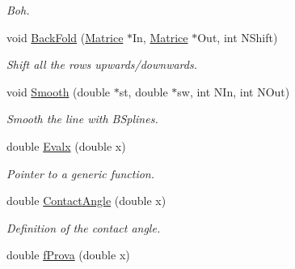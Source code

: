 \begin{DoxyCompactItemize}
\begin{DoxyCompactList}\small\item\em Boh. \end{DoxyCompactList}\item 
void \hyperlink{classMatematica_abfaf13060e1740268d65e5a38a410cd6}{Back\+Fold} (\hyperlink{classMatrice}{Matrice} $\ast$In, \hyperlink{classMatrice}{Matrice} $\ast$Out, int N\+Shift)\hypertarget{classMatematica_abfaf13060e1740268d65e5a38a410cd6}{}\label{classMatematica_abfaf13060e1740268d65e5a38a410cd6}

\begin{DoxyCompactList}\small\item\em Shift all the rows upwards/downwards. \end{DoxyCompactList}\item 
void \hyperlink{classMatematica_a2cd25ce574ac8496d0228106f1acb7e6}{Smooth} (double $\ast$st, double $\ast$sw, int N\+In, int N\+Out)\hypertarget{classMatematica_a2cd25ce574ac8496d0228106f1acb7e6}{}\label{classMatematica_a2cd25ce574ac8496d0228106f1acb7e6}

\begin{DoxyCompactList}\small\item\em Smooth the line with B\+Splines. \end{DoxyCompactList}\item 
double \hyperlink{classMatematica_a628ac1d3c644d78362e0ec3aff1d2448}{Evalx} (double x)\hypertarget{classMatematica_a628ac1d3c644d78362e0ec3aff1d2448}{}\label{classMatematica_a628ac1d3c644d78362e0ec3aff1d2448}

\begin{DoxyCompactList}\small\item\em Pointer to a generic function. \end{DoxyCompactList}\item 
double \hyperlink{classMatematica_a2dd3ba2334c4444c4ef406347618c170}{Contact\+Angle} (double x)\hypertarget{classMatematica_a2dd3ba2334c4444c4ef406347618c170}{}\label{classMatematica_a2dd3ba2334c4444c4ef406347618c170}

\begin{DoxyCompactList}\small\item\em Definition of the contact angle. \end{DoxyCompactList}\item 
double \hyperlink{classMatematica_a4f67dd8ca48e4eccf15e32c736db6621}{f\+Prova} (double x)\hypertarget{classMatematica_a4f67dd8ca48e4eccf15e32c736db6621}{}\label{classMatematica_a4f67dd8ca48e4eccf15e32c736db6621}


\end{DoxyCompactItemize}
